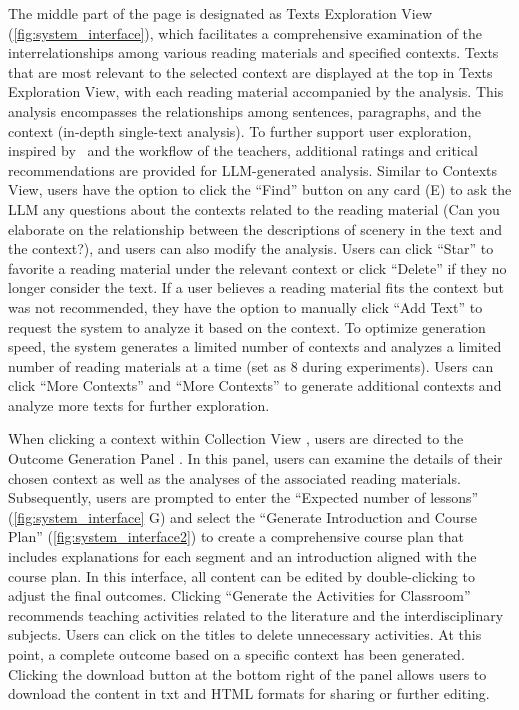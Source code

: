 The middle part of the page is designated as Texts Exploration View (\autoref{fig:system_interface}), which facilitates a comprehensive examination of the interrelationships among various reading materials and specified contexts. 
Texts that are most relevant to the selected context are displayed at the top in Texts Exploration View, with each reading material accompanied by the analysis.
This analysis encompasses the relationships among sentences, paragraphs, and the context (\ie in-depth single-text analysis). 
To further support user exploration, inspired by~\cite{wu2024transagents} and the workflow of the teachers, additional ratings and critical recommendations are provided for LLM-generated analysis.
Similar to Contexts View, users have the option to click the ``Find'' button on any card (E) to ask the LLM any questions about the contexts related to the reading material (\eg Can you elaborate on the relationship between the descriptions of scenery in the text and the context?), and users can also modify the analysis. 
Users can click ``Star'' to favorite a reading material under the relevant context or click ``Delete'' if they no longer consider the text. If a user believes a reading material fits the context but was not recommended, they have the option to manually click ``Add Text'' to request the system to analyze it based on the context.
To optimize generation speed, the system generates a limited number of contexts and analyzes a limited number of reading materials at a time (set as 8 during experiments). Users can click ``More Contexts'' and ``More Contexts'' to generate additional contexts and analyze more texts for further exploration.

When clicking a context within Collection View  , users are directed to the Outcome Generation Panel .
In this panel, users can examine the details of their chosen context as well as the analyses of the associated reading materials. 
Subsequently, users are prompted to enter the ``Expected number of lessons'' (\autoref{fig:system_interface} G) and select the ``Generate Introduction and Course Plan'' (\autoref{fig:system_interface2}) to create a comprehensive course plan that includes explanations for each segment and an introduction aligned with the course plan. 
In this interface, all content can be edited by double-clicking to adjust the final outcomes. Clicking ``Generate the Activities for Classroom'' recommends teaching activities related to the literature and the interdisciplinary subjects. Users can click on the titles to delete unnecessary activities.
At this point, a complete outcome based on a specific context has been generated.
Clicking the download button at the bottom right of the panel allows users to download the content in txt and HTML formats for sharing or further editing.


